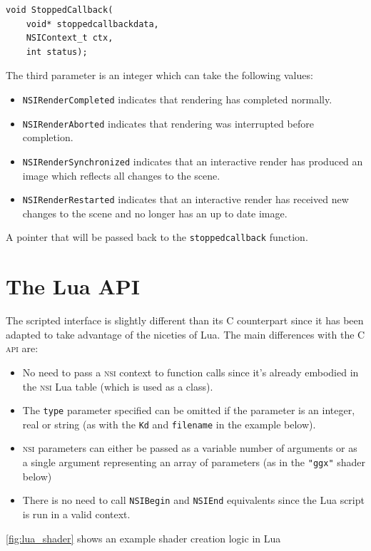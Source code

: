 \documentclass[oneside,ebook]{memoir}
\newcommand*{\acronym}[1]{\textsc{\lowercase{#1}}}
\newcommand{\paramlistitemTN}[2]{\item[#2\textcolor{lightgray}{\dotfill}#1]}
\begin{document}
\begin{paramlist}
\begin{lstlisting}[style=CAPI]
void StoppedCallback(
	void* stoppedcallbackdata,
	NSIContext_t ctx,
	int status);
\end{lstlisting}
The third parameter is an integer which can take the following values:
\begin{itemize}
	\item \lstinline|NSIRenderCompleted| indicates that rendering has completed normally.
	\item \lstinline|NSIRenderAborted| indicates that rendering was interrupted before completion.
	\item \lstinline|NSIRenderSynchronized| indicates that an interactive render has produced an image which reflects all changes to the scene.
	\item \lstinline|NSIRenderRestarted| indicates that an interactive render has received new changes to the scene and no longer has an up to date image.
\end{itemize}
\paramlistitemTN{pointer}{stoppedcallbackdata}
A pointer that will be passed back to the \lstinline|stoppedcallback| function.
\end{paramlist}

\section{The Lua API}
\label{section:Lua}
The scripted interface is slightly different than its C counterpart since it has been adapted to take advantage of the niceties of Lua. The main differences with the C \acronym{API} are:
\begin{itemize}
\item No need to pass a \acronym{NSI} context to function calls since it's already embodied in the \acronym{NSI} Lua table (which is used as a class).
\item The \lstinline|type| parameter specified can be omitted if the parameter is an integer, real or string (as with the \lstinline|Kd| and \lstinline|filename|  in the example below).
\item \acronym{NSI} parameters can either be passed as a variable number of arguments or as a single argument representing an array of parameters (as in the \lstinline|"ggx"| shader below)
\item There is no need to call \lstinline|NSIBegin| and \lstinline|NSIEnd| equivalents since the  Lua script is run in a valid context.
\end{itemize}
\autoref{fig:lua_shader} shows an example shader creation logic in Lua
\end{document}
